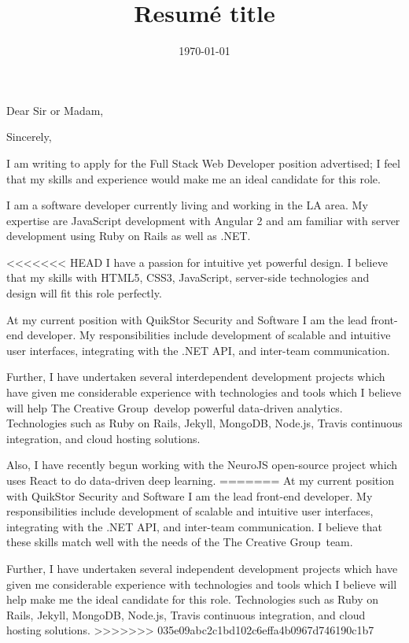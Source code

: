 \documentclass[11pt,a4paper,sans]{moderncv}        %
\title{Resumé title}                               %
\newcommand{\company}{The Creative Group}
\newcommand{\company}{Science 37}
\begin{document}
\recipient{}{}
\date{\today}
\opening{Dear Sir or Madam,}
\closing{Sincerely,}
\makelettertitle

I am writing to apply for the Full Stack Web Developer position advertised; I feel that my skills and experience would make me an ideal candidate for this role.

I am a software developer currently living and working in the LA area.
My expertise are JavaScript development with Angular 2 and am familiar with server development using Ruby on Rails as well as .NET.

<<<<<<< HEAD
I have a passion for intuitive yet powerful design. I believe that my skills with HTML5, CSS3, JavaScript, server-side technologies and design will fit this role perfectly.

At my current position with QuikStor Security and Software I am the lead front-end developer. 
My responsibilities include development of scalable and intuitive user interfaces, integrating with the .NET API, and inter-team communication.

Further, I have undertaken several interdependent development projects which have given me considerable experience with technologies and tools which I believe will help \company~develop powerful data-driven analytics. Technologies such as Ruby on Rails, Jekyll, MongoDB, Node.js, Travis continuous integration, and cloud hosting solutions.

Also, I have recently begun working with the NeuroJS open-source project which uses React to do data-driven deep learning.
=======
At my current position with QuikStor Security and Software  I am the lead front-end developer. 
My responsibilities include development of scalable and intuitive user interfaces, integrating with the .NET API, and inter-team communication.
I believe that these skills match well with the needs of the \company~team.

Further, I have undertaken several independent development projects which have given me considerable experience with technologies and tools which I believe will help make me the ideal candidate for this role. 
Technologies such as Ruby on Rails, Jekyll, MongoDB, Node.js, Travis continuous integration, and cloud hosting solutions.
>>>>>>> 035e09abc2c1bd102c6effa4b0967d746190c1b7
\end{document}

